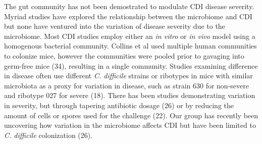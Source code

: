 \documentclass[
  12pt,
]{article}
\begin{document}
The gut community has not been demostrated to modulate CDI disease
severity. Myriad studies have explored the relationship between the
microbiome and CDI but none have ventured into the variation of disease
severity due to the microbiome. Most CDI studies employ either an
\emph{in vitro} or \emph{in vivo} model using a homogenous bacterial
community. Collins et al used multiple human communities to colonize
mice, however the communities were pooled prior to gavaging into
germ-free mice (34), resulting in a single community. Studies examining
difference in disease often use different \emph{C. difficile} strains or
ribotypes in mice with similar microbiota as a proxy for variation in
disease, such as strain 630 for non-severe and ribotype 027 for severe
(18). There has been studies demonstrating variation in severity, but
through tapering antibiotic dosage (26) or by reducing the amount of
cells or spores used for the challenge (22). Our group has recently been
uncovering how variation in the microbiome affects CDI but have been
limited to \emph{C. difficile} colonization (26).
\end{document}
